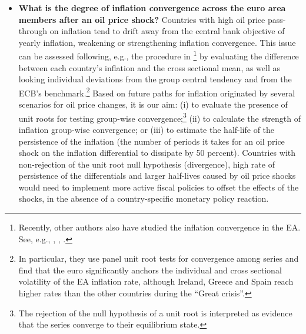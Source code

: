 \documentclass{article}\usepackage[]{graphicx}\usepackage[]{color}
\begin{document}
\begin{itemize}
\item \textbf{What is the degree of inflation convergence across the euro area members after an oil price shock?} Countries with high oil price pass-through on inflation tend to drift away from the central bank objective of yearly inflation, weakening or strengthening inflation convergence. This issue can be assessed following, e.g., the procedure in \cite{Lopez2012}\footnote{Recently, other authors also have studied the inflation convergence in the EA. See, e.g., \cite{Becker2009}, \cite{Karanasos2016}, \cite{Ogrokhina2015}.} by evaluating the difference between each country's inflation and the cross sectional mean, as well as looking individual deviations from the group central tendency and from the ECB's benchmark.\footnote{In particular, they use panel unit root tests for convergence among series and find that the euro significantly anchors the individual and cross sectional volatility of the EA inflation rate, although Ireland, Greece and Spain reach higher rates than the other countries during the ``Great crisis''.} Based on future paths for inflation originated by several scenarios for oil price changes, it is our aim: (i) to evaluate the presence of unit roots for testing group-wise convergence;\footnote{The rejection of the null hypothesis of a unit root is interpreted as evidence that the series converge to their equilibrium state.} (ii) to calculate the strength of inflation group-wise convergence; or (iii) to estimate the half-life of the persistence of the inflation (the number of periods it takes for an oil price shock on the inflation differential to dissipate by 50 percent). Countries with non-rejection of the unit root null hypothesis (divergence), high rate of persistence of the differentials and larger half-lives caused by oil price shocks would need to implement more active fiscal policies to offset the effects of the shocks, in the absence of a country-specific monetary policy reaction.


\end{itemize}
\end{document}
